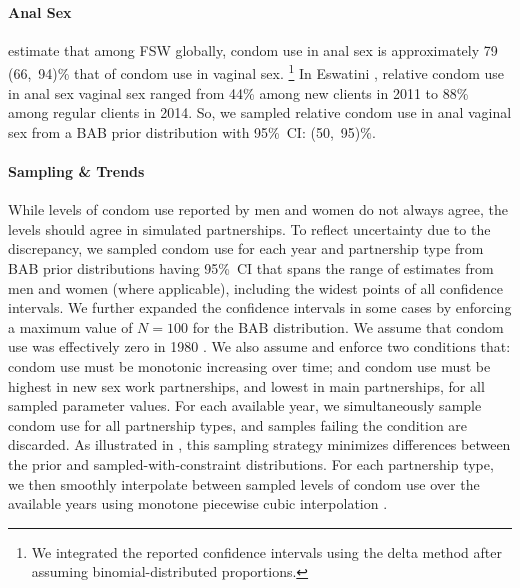 \paragraph{Anal Sex}
\citet{Owen2020sr} estimate that among FSW globally,
condom use in anal sex is approximately 79 (66,~94)\% that of condom use in vaginal sex.%
\footnote{We integrated the reported confidence intervals using the delta method
  after assuming binomial-distributed proportions.}
In Eswatini \cite{Baral2014,EswKP2014}, relative condom use in anal sex \vs vaginal sex
ranged from 44\% among new clients in 2011 to 88\% among regular clients in 2014.
So, we sampled relative condom use in anal \vs vaginal sex from a BAB prior distribution
with 95\%~CI: (50,~95)\%.
\paragraph{Sampling \& Trends}
While levels of condom use reported by men and women do not always agree,
the levels should agree in simulated partnerships.
To reflect uncertainty due to the discrepancy,
we sampled condom use for each year and partnership type
from BAB prior distributions having 95\%~CI
that spans the range of estimates from men and women (where applicable),
including the widest points of all confidence intervals.
We further expanded the confidence intervals in some cases
by enforcing a maximum value of $N = 100$ for the BAB distribution.
We assume that condom use was effectively zero in 1980 \cite{SFHS1988}.
We also assume and enforce two conditions that:
condom use must be monotonic increasing over time; and
condom use must be highest in new sex work partnerships, and lowest in main partnerships,
for all sampled parameter values.
For each available year, we simultaneously sample condom use for all partnership types,
and samples failing the condition are discarded.
As illustrated in , this sampling strategy
minimizes differences between the prior and sampled-with-constraint distributions.
For each partnership type, we then smoothly interpolate
between sampled levels of condom use over the available years
using monotone piecewise cubic interpolation \cite{Fritsch1980}.
